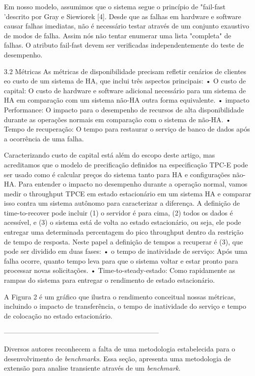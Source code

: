 Em nosso modelo, assumimos que o sistema segue o princípio de "fail-fast 'descrito por Gray e Siewiorek [4]. Desde que as falhas em hardware e software causar falhas imediatas, não é necessário testar através de um conjunto exaustivo de modos de falha.
Assim nós não tentar enumerar uma lista "completa" de falhas. O atributo fail-fast devem ser verificadas independentemente do teste de desempenho.

3.2 Métricas
As métricas de disponibilidade precisam refletir cenários de clientes eo custo de um sistema de HA, que inclui três aspectos principais:
• O custo de capital: O custo de hardware e software adicional necessário para um sistema de HA em comparação com um sistema não-HA outra forma equivalente.
• impacto Performance: O impacto para o desempenho de recursos de alta disponibilidade durante as operações normais em comparação com o sistema de não-HA.
• Tempo de recuperação: O tempo para restaurar o serviço de banco de dados após a ocorrência de uma falha.

Caracterizando custo de capital está além do escopo deste artigo, mas acreditamos que o modelo de precificação definidos na especificação TPC-E pode ser usado como é calcular preços do sistema tanto para HA e configurações não-HA.
Para entender o impacto no desempenho durante a operação normal, vamos medir o throughput TPCE em estado estacionário em um sistema HA e comparar isso contra um sistema autônomo para caracterizar a diferença.
A definição de time-to-recover pode incluir (1) o servidor é para cima, (2) todos os dados é acessível, e (3) o sistema está de volta ao estado estacionário, ou seja, ele pode entregar uma determinada percentagem do pico throughput dentro da restrição de tempo de resposta. Neste papel a definição de tempos a recuperar é (3), que pode ser dividido em duas fases:
• o tempo de inatividade de serviço: Após uma falha ocorre, quanto tempo leva para que o sistema voltar e estar pronto para processar novas solicitações.
• Time-to-steady-estado: Como rapidamente as rampas do sistema para entregar o rendimento de estado estacionário.

A Figura 2 é um gráfico que ilustra o rendimento conceitual nossas métricas, incluindo o impacto de transferência, o tempo de inatividade do serviço e tempo de colocação no estado estacionário.

--------------------------------------------------------------------
\label{sec-method}

Diversos autores \cite{Hinnant1988, Price1989, KaiSachs2010, Folkerts2013, Marco2012} reconhecem a falta de uma metodologia estabelecida para o desenvolvimento de \textit{benchmarks}. Essa seção, apresenta uma metodologia de extensão para analise transiente através de um \textit{benchmark}. 

